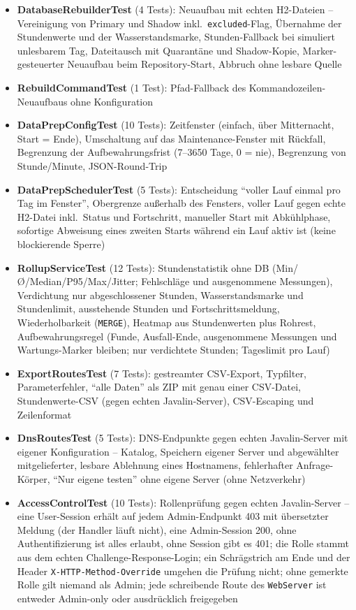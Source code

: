 \begin{itemize}
    \item \textbf{DatabaseRebuilderTest} (4 Tests): Neuaufbau mit echten H2-Dateien -- Vereinigung von Primary und Shadow inkl.\ \texttt{excluded}-Flag, Übernahme der Stundenwerte und der Wasserstandsmarke, Stunden-Fallback bei simuliert unlesbarem Tag, Dateitausch mit Quarantäne und Shadow-Kopie, Marker-gesteuerter Neuaufbau beim Repository-Start, Abbruch ohne lesbare Quelle
    \item \textbf{RebuildCommandTest} (1 Test): Pfad-Fallback des Kommandozeilen-Neuaufbaus ohne Konfiguration
    \item \textbf{DataPrepConfigTest} (10 Tests): Zeitfenster (einfach, über Mitternacht, Start = Ende), Umschaltung auf das Maintenance-Fenster mit Rückfall, Begrenzung der Aufbewahrungsfrist (7--3650 Tage, 0 = nie), Begrenzung von Stunde/Minute, JSON-Round-Trip
    \item \textbf{DataPrepSchedulerTest} (5 Tests): Entscheidung \enquote{voller Lauf einmal pro Tag im Fenster}, Obergrenze außerhalb des Fensters, voller Lauf gegen echte H2-Datei inkl.\ Status und Fortschritt, manueller Start mit Abkühlphase, sofortige Abweisung eines zweiten Starts während ein Lauf aktiv ist (keine blockierende Sperre)
    \item \textbf{RollupServiceTest} (12 Tests): Stundenstatistik ohne DB (Min/Ø/Median/P95/Max/Jitter; Fehlschläge und ausgenommene Messungen), Verdichtung nur abgeschlossener Stunden, Wasserstandsmarke und Stundenlimit, ausstehende Stunden und Fortschrittsmeldung, Wiederholbarkeit (\texttt{MERGE}), Heatmap aus Stundenwerten plus Rohrest, Aufbewahrungsregel (Funde, Ausfall-Ende, ausgenommene Messungen und Wartungs-Marker bleiben; nur verdichtete Stunden; Tageslimit pro Lauf)
    \item \textbf{ExportRoutesTest} (7 Tests): gestreamter CSV-Export, Typfilter, Parameterfehler, \enquote{alle Daten} als ZIP mit genau einer CSV-Datei, Stundenwerte-CSV (gegen echten Javalin-Server), CSV-Escaping und Zeilenformat
    \item \textbf{DnsRoutesTest} (5 Tests): DNS-Endpunkte gegen echten Javalin-Server mit eigener Konfiguration -- Katalog, Speichern eigener Server und abgewählter mitgelieferter, lesbare Ablehnung eines Hostnamens, fehlerhafter Anfrage-Körper, \enquote{Nur eigene testen} ohne eigene Server (ohne Netzverkehr)
    \item \textbf{AccessControlTest} (10 Tests): Rollenprüfung gegen echten Javalin-Server -- eine User-Session erhält auf jedem Admin-Endpunkt 403 mit übersetzter Meldung (der Handler läuft nicht), eine Admin-Session 200, ohne Authentifizierung ist alles erlaubt, ohne Session gibt es 401; die Rolle stammt aus dem echten Challenge-Response-Login; ein Schrägstrich am Ende und der Header \texttt{X-HTTP-Method-Override} umgehen die Prüfung nicht; ohne gemerkte Rolle gilt niemand als Admin; jede schreibende Route des \texttt{WebServer} ist entweder Admin-only oder ausdrücklich freigegeben

\end{itemize}
